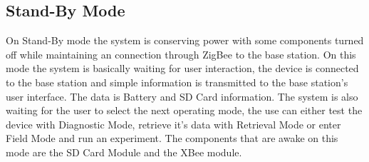 \subsection{Stand-By Mode}
On Stand-By mode the system is conserving power with some components turned off while maintaining an connection through ZigBee to the base station. On this mode the system is basically waiting for user interaction, the device is connected to the base station and simple information is transmitted to the base station's user interface. The data is Battery and SD Card information. The system is also waiting for the user to select the next operating mode, the use can either test the device with Diagnostic Mode, retrieve it's data with Retrieval Mode or enter Field Mode and run an experiment. The components that are awake on this mode are the SD Card Module and the XBee module.
